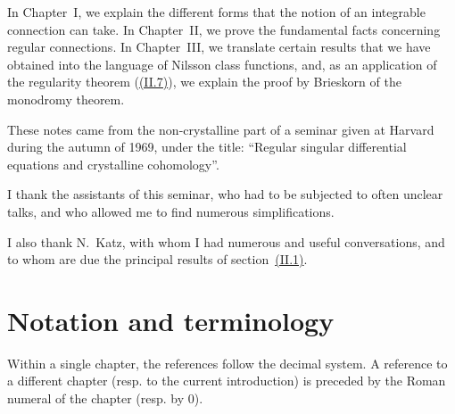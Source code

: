 \documentclass{report}
\newcommand{\oldpage}[1]{\marginpar{\footnotesize$\Big\vert$ \textit{p.~#1}}}
\begin{document}
In Chapter~I, we explain the different forms that the notion of an integrable connection can take.
In Chapter~II, we prove the fundamental facts concerning regular connections.
In Chapter~III, we translate certain results that we have obtained into the language of Nilsson class functions, and, as an application of the regularity theorem (\hyperref[II.7]{(II.7)}), we explain the proof by Brieskorn \cite{5} of the monodromy theorem.

These notes came from the non-crystalline part of a seminar given at Harvard during the autumn of 1969, under the title: ``Regular singular differential equations and crystalline cohomology''.

I thank the assistants of this seminar, who had to be subjected to often unclear talks, and who allowed me to find numerous simplifications.

I also thank N.~Katz, with whom I had numerous and useful conversations, and to whom are due the principal results of section~\hyperref[II.1]{(II.1)}.


\section*{Notation and terminology}

\oldpage{2}
Within a single chapter, the references follow the decimal system.
A reference to a different chapter (resp. to the current introduction) is preceded by the Roman numeral of the chapter (resp. by 0).
\end{document}

